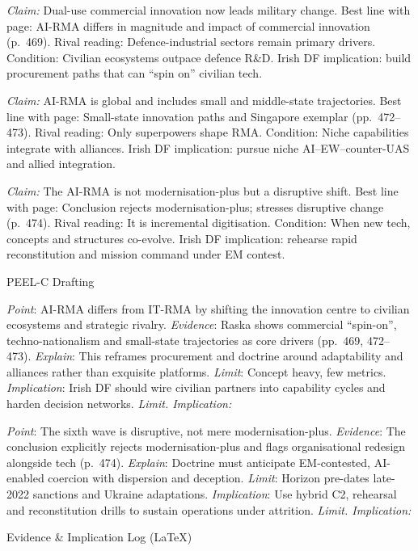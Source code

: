 \textit{Claim:} Dual-use commercial innovation now leads military change.
Best line with page: AI-RMA differs in magnitude and impact of commercial innovation (p.~469).
Rival reading: Defence-industrial sectors remain primary drivers.
Condition: Civilian ecosystems outpace defence R&D.
Irish DF implication: build procurement paths that can “spin on” civilian tech.

\textit{Claim:} AI-RMA is global and includes small and middle-state trajectories.
Best line with page: Small-state innovation paths and Singapore exemplar (pp.~472–473).
Rival reading: Only superpowers shape RMA.
Condition: Niche capabilities integrate with alliances.
Irish DF implication: pursue niche AI–EW–counter-UAS and allied integration.

\textit{Claim:} The AI-RMA is not modernisation-plus but a disruptive shift.
Best line with page: Conclusion rejects modernisation-plus; stresses disruptive change (p.~474).
Rival reading: It is incremental digitisation.
Condition: When new tech, concepts and structures co-evolve.
Irish DF implication: rehearse rapid reconstitution and mission command under EM contest.

PEEL-C Drafting

\textit{Point}: AI-RMA differs from IT-RMA by shifting the innovation centre to civilian ecosystems and strategic rivalry.
\textit{Evidence}: Raska shows commercial “spin-on”, techno-nationalism and small-state trajectories as core drivers (pp.~469, 472–473).
\textit{Explain}: This reframes procurement and doctrine around adaptability and alliances rather than exquisite platforms.
\textit{Limit}: Concept heavy, few metrics.
\textit{Implication}: Irish DF should wire civilian partners into capability cycles and harden decision networks.
\textit{Limit. Implication:}

\textit{Point}: The sixth wave is disruptive, not mere modernisation-plus.
\textit{Evidence}: The conclusion explicitly rejects modernisation-plus and flags organisational redesign alongside tech (p.~474).
\textit{Explain}: Doctrine must anticipate EM-contested, AI-enabled coercion with dispersion and deception.
\textit{Limit}: Horizon pre-dates late-2022 sanctions and Ukraine adaptations.
\textit{Implication}: Use hybrid C2, rehearsal and reconstitution drills to sustain operations under attrition.
\textit{Limit. Implication:}

Evidence & Implication Log (LaTeX)

